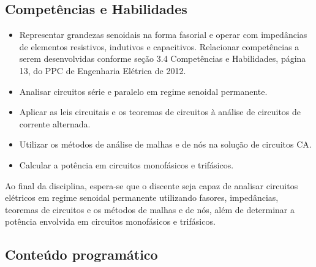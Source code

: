 \documentclass[oneside,a4paper,12pt]{article}
\begin{document}
\begin{snugshade}
  \section{Competências e Habilidades}
\end{snugshade}

\begin{itemize}

    \item Representar grandezas senoidais na forma fasorial e operar com impedâncias de elementos resistivos, indutivos e capacitivos. Relacionar competências a serem desenvolvidas conforme seção 3.4 Competências e Habilidades, página 13, do PPC de Engenharia Elétrica de 2012.

    \item Analisar circuitos série e paralelo em regime senoidal permanente.

    \item Aplicar as leis circuitais e os teoremas de circuitos à análise de circuitos de corrente alternada.

    \item Utilizar os métodos de análise de malhas e de nós na solução de circuitos CA.

    \item Calcular a potência em circuitos monofásicos e trifásicos.

\end{itemize}

Ao final da disciplina, espera-se que o discente seja capaz de analisar circuitos elétricos em regime senoidal permanente utilizando fasores, impedâncias, teoremas de circuitos e os métodos de malhas e de nós, além de determinar a potência envolvida em circuitos monofásicos e trifásicos.


  \begin{snugshade}
  \section{Conteúdo programático} %
  \end{snugshade}
\end{document}
